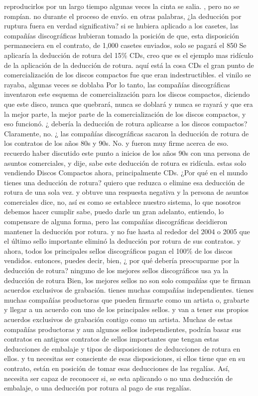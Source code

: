 \documentclass[10pt]{book}
\begin{document}
reproducirlos por un largo tiempo algunas veces la cinta se salia. , pero no se rompían. no durante el proceso de envío. en otras palabras, ¿la deducción por ruptura fuera en verdad significativa? si se hubiera aplicado a los casetes, las compañías discográficas hubieran tomado la posición de que, esta disposición permaneciera en el contrato, de 1,000 casetes enviados, solo se pagará el 850 Se aplicaría la deducción de rotura del 15\% CDs, creo que es el ejemplo mas ridículo de la aplicación de la deducción de rotura. aquí está la cosa CDs el gran punto de comercialización de los discos compactos fue que eran indestructibles. el vinilo se rayaba, algunas veces se doblaba Por lo tanto, las compañías discográficas inventaron este esquema de comercialización para los discos compactos, diciendo que este disco, nunca que quebrará, nunca se doblará y nunca se rayará y que era la mejor parte, la mejor parte de la comercialización de los discos compactos, y eso funcionó. ¿ debería la deducción de rotura  aplicarse a los discos compactos? Claramente, no. ¿ las compañías discográficas sacaron la deducción de rotura de los contratos de los años 80s y 90s. No. y fueron muy firme acerca de eso. recuerdo haber discutido este punto a inicios de los años 90s con una persona de asuntos comerciales, y dije, sabe este deducción de rotura es ridícula. estas solo vendiendo Discos Compactos ahora, principalmente CDs. ¿Por qué en el mundo tienes una deducción de rotura? quiero que reduzca o elimine esa deducción de rotura de una sola vez. y obtuve una respuesta negativa y la persona de asuntos comerciales dice, no, así es como se establece nuestro sistema, lo que nosotros debemos hacer cumplir sabe, puedo darle un gran adelanto, entiendo, lo compensare de alguna forma, pero las compañías discográficas decidieron mantener la deducción por rotura. y no fue hasta al rededor del 2004 o 2005 que el último sello importante eliminó la deducción por rotura de sus contratos. y ahora, todos los principales sellos discográficos pagan el 100\% de los discos vendidos. entonces, puedes decir, bien, ¿ por qué debería preocuparme por la deducción de rotura? ninguno de los mejores sellos discográficos usa ya la deducción de rotura Bien, los mejores sellos no son solo compañías que te firman acuerdos exclusivos de grabación. tienes muchas compañías independientes. tienes muchas compañías productoras que pueden firmarte como un artista o, grabarte y llegar a un acuerdo con uno de los principales sellos. y van a tener sus propios acuerdos exclusivos de grabación contigo como un artista. Muchas de estas compañías productoras y aun algunos sellos independientes, podrán basar sus contratos en antiguos contratos de sellos importantes que tengan estas deducciones de embalaje y tipos de disposiciones de deducciones de rotura en ellos. y tu necesitas ser consciente de esas disposiciones, si ellos tiene que en su contrato, están en posición de tomar esas deducciones de las regalías. Así, necesita ser capaz de reconocer si, se esta aplicando o no una deducción de embalaje, o una deducción por rotura al pago de sus regalías.
\end{document}
